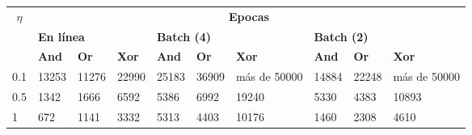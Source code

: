 \begin{table}[H]
    \begin{tabular}{|l|lllllllll|}
    \hline
    \multicolumn{1}{|c|}{\multirow{3}{*}{\textbf{$\eta$}}} & \multicolumn{9}{c|}{\textbf{Epocas}}                                                                                                                                                                                                                                                                      \\ \cline{2-10} 
    \multicolumn{1}{|c|}{}                                 & \multicolumn{3}{l|}{\textbf{En línea}}                                                                   & \multicolumn{3}{l|}{\textbf{Batch (4)}}                                                                  & \multicolumn{3}{l|}{\textbf{Batch (2)}}                                             \\ \cline{2-10} 
    \multicolumn{1}{|c|}{}                                 & \multicolumn{1}{l|}{\textbf{And}} & \multicolumn{1}{l|}{\textbf{Or}} & \multicolumn{1}{l|}{\textbf{Xor}} & \multicolumn{1}{l|}{\textbf{And}} & \multicolumn{1}{l|}{\textbf{Or}} & \multicolumn{1}{l|}{\textbf{Xor}} & \multicolumn{1}{l|}{\textbf{And}} & \multicolumn{1}{l|}{\textbf{Or}} & \textbf{Xor} \\ \hline
    0.1                                                    & \multicolumn{1}{l|}{13253}        & \multicolumn{1}{l|}{11276}       & \multicolumn{1}{l|}{22990}        & \multicolumn{1}{l|}{25183}        & \multicolumn{1}{l|}{36909}       & \multicolumn{1}{l|}{más de 50000} & \multicolumn{1}{l|}{14884}        & \multicolumn{1}{l|}{22248}       & más de 50000 \\ \hline
    0.5                                                    & \multicolumn{1}{l|}{1342}         & \multicolumn{1}{l|}{1666}        & \multicolumn{1}{l|}{6592}         & \multicolumn{1}{l|}{5386}         & \multicolumn{1}{l|}{6992}        & \multicolumn{1}{l|}{19240}        & \multicolumn{1}{l|}{5330}         & \multicolumn{1}{l|}{4383}        & 10893        \\ \hline
    1                                                      & \multicolumn{1}{l|}{672}          & \multicolumn{1}{l|}{1141}        & \multicolumn{1}{l|}{3332}         & \multicolumn{1}{l|}{5313}         & \multicolumn{1}{l|}{4403}        & \multicolumn{1}{l|}{10176}        & \multicolumn{1}{l|}{1460}         & \multicolumn{1}{l|}{2308}        & 4610         \\ \hline

\end{tabular}
\end{table}
